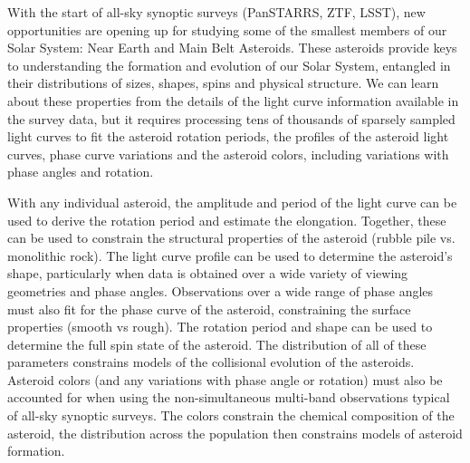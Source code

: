 \documentclass[11pt]{article}
\begin{document}
%
%
%

\sciencejustification
With the start of all-sky synoptic surveys (PanSTARRS, ZTF, LSST), new opportunities
are opening up for studying some of the smallest members of our Solar System: 
Near Earth and Main Belt Asteroids. These asteroids provide keys to understanding
the formation and evolution of our Solar System, entangled in their distributions of
sizes, shapes, spins and physical structure. We can learn about these properties from
the details of the light curve information available in the survey data, but it requires processing
tens of thousands of sparsely sampled light curves to fit the asteroid rotation periods, 
the profiles of the asteroid light curves, phase curve variations and the asteroid colors,
including variations with phase angles and rotation.

With any individual asteroid, the amplitude and period of the light curve can be used
to derive the rotation period and estimate the elongation. Together, these can be used
to constrain the structural properties of the asteroid (rubble pile vs. monolithic rock). 
The light curve profile can be used to determine the 
asteroid's shape, particularly when data is obtained over a wide variety of viewing geometries
and phase angles. Observations over a wide range of phase angles must also fit for the phase curve
of the asteroid, constraining the surface properties (smooth vs rough). The rotation period and shape can 
be used to determine the full spin state of the asteroid. The distribution of all of these parameters 
constrains models of the collisional evolution of the asteroids. Asteroid colors (and any variations with 
phase angle or rotation) must also be accounted for when using the non-simultaneous multi-band 
observations typical of all-sky synoptic surveys. The colors constrain the chemical composition of the 
asteroid, the distribution across the population then constrains models of asteroid formation.
\end{document}
